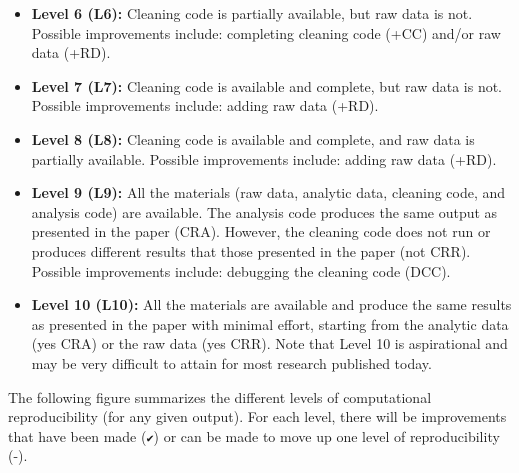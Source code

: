 \documentclass[
]{book}
\begin{document}
\begin{itemize}
\item
  \textbf{Level 6 (L6):} Cleaning code is partially available, but raw data is not. Possible improvements include: completing cleaning code (+CC) and/or raw data (+RD).
\item
  \textbf{Level 7 (L7):} Cleaning code is available and complete, but raw data is not. Possible improvements include: adding raw data (+RD).
\item
  \textbf{Level 8 (L8):} Cleaning code is available and complete, and raw data is partially available. Possible improvements include: adding raw data (+RD).
\item
  \textbf{Level 9 (L9):} All the materials (raw data, analytic data, cleaning code, and analysis code) are available. The analysis code produces the same output as presented in the paper (CRA). However, the cleaning code does not run or produces different results that those presented in the paper (not CRR). Possible improvements include: debugging the cleaning code (DCC).
\item
  \textbf{Level 10 (L10):} All the materials are available and produce the same results as presented in the paper with minimal effort, starting from the analytic data (yes CRA) or the raw data (yes CRR). Note that Level 10 is aspirational and may be very difficult to attain for most research published today.
\end{itemize}

The following figure summarizes the different levels of computational reproducibility (for any given output). For each level, there will be improvements that have been made (\texttt{✔}) or can be made to move up one level of reproducibility (-).
\end{document}

